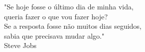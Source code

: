 \thispagestyle{empty}%
\newpage
\null\vfill
\begin{flushright}

"Se hoje fosse o \'{u}ltimo dia de minha vida,\\ queria fazer o que vou fazer hoje? \\ Se a resposta fosse n\~{a}o muitos dias seguidos, \\ sabia que precisava mudar algo."\\ Steve Jobs

\end{flushright}
   \vspace{3.0cm}
